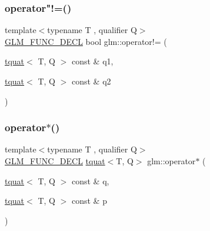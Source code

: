 \subsubsection{\texorpdfstring{operator"!=()}{operator!=()}}
{\footnotesize\ttfamily template$<$typename T , qualifier Q$>$ \\
\hyperlink{setup_8hpp_ab2d052de21a70539923e9bcbf6e83a51}{G\+L\+M\+\_\+\+F\+U\+N\+C\+\_\+\+D\+E\+CL} bool glm\+::operator!= (\begin{DoxyParamCaption}\item[{\hyperlink{structglm_1_1tquat}{tquat}$<$ T, Q $>$ const \&}]{q1,  }\item[{\hyperlink{structglm_1_1tquat}{tquat}$<$ T, Q $>$ const \&}]{q2 }\end{DoxyParamCaption})}

\mbox{\label{group__gtc__quaternion_ga447cda99bd10c12696177d490049a8f5}} 
\subsubsection{\texorpdfstring{operator$\ast$()}{operator*()}\hspace{0.1cm}{\footnotesize\ttfamily [1/7]}}
{\footnotesize\ttfamily template$<$typename T , qualifier Q$>$ \\
\hyperlink{setup_8hpp_ab2d052de21a70539923e9bcbf6e83a51}{G\+L\+M\+\_\+\+F\+U\+N\+C\+\_\+\+D\+E\+CL} \hyperlink{structglm_1_1tquat}{tquat}$<$T, Q$>$ glm\+::operator$\ast$ (\begin{DoxyParamCaption}\item[{\hyperlink{structglm_1_1tquat}{tquat}$<$ T, Q $>$ const \&}]{q,  }\item[{\hyperlink{structglm_1_1tquat}{tquat}$<$ T, Q $>$ const \&}]{p }\end{DoxyParamCaption})}

\mbox{\label{group__gtc__quaternion_ga01cacfba4a28b21e7af7cdbb122c4ef9}} 
